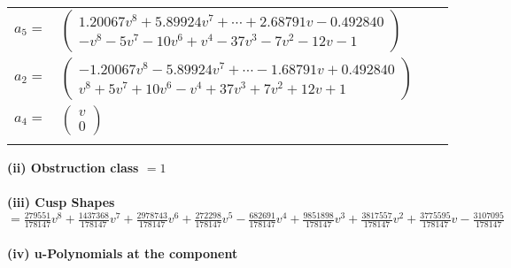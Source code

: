 \documentclass[1p]{elsarticle_modified}
\theoremstyle{definition}
\begin{document}
\begin{tabular}{m{7pt} m{180pt} m{7pt} m{180pt} }
\flushright $a_{5}=$&$\begin{pmatrix}1.20067 v^{8}+5.89924 v^{7}+\cdots+2.68791 v-0.492840\\- v^8-5 v^7-10 v^6+v^4-37 v^3-7 v^2-12 v-1\end{pmatrix}$ \\
\flushright $a_{2}=$&$\begin{pmatrix}-1.20067 v^{8}-5.89924 v^{7}+\cdots-1.68791 v+0.492840\\v^8+5 v^7+10 v^6- v^4+37 v^3+7 v^2+12 v+1\end{pmatrix}$ \\
\flushright $a_{4}=$&$\begin{pmatrix}v\\0\end{pmatrix}$\\&\end{tabular}
\flushleft \textbf{(ii) Obstruction class $= 1$}\\~\\
\flushleft \textbf{(iii) Cusp Shapes $= \frac{279551}{178147} v^8+\frac{1437368}{178147} v^7+\frac{2978743}{178147} v^6+\frac{272298}{178147} v^5-\frac{682691}{178147} v^4+\frac{9851898}{178147} v^3+\frac{3817557}{178147} v^2+\frac{3775595}{178147} v-\frac{3107095}{178147}$}\\~\\
\newpage\renewcommand{\arraystretch}{1}
\flushleft \textbf{(iv) u-Polynomials at the component}\newline \\
\end{document}
